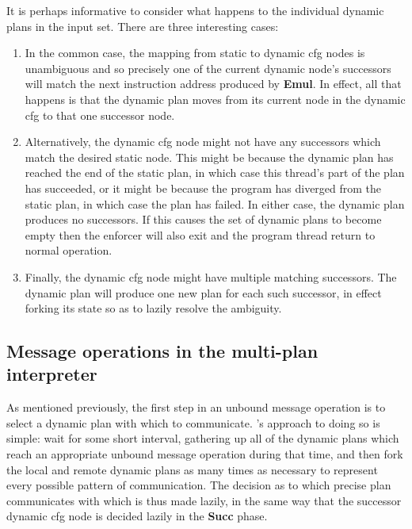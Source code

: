 It is perhaps informative to consider what happens to the individual
dynamic plans in the input set.  There are three interesting cases:
\begin{enumerate}
\item In the common case, the mapping from static to \gls{dynamic cfg}
  nodes is unambiguous and so precisely one of the current dynamic
  node's successors will match the next instruction address produced
  by \textbf{Emul}.  In effect, all that happens is that the dynamic
  plan moves from its current node in the \gls{dynamic cfg} to that
  one successor node.

\item Alternatively, the \gls{dynamic cfg} node might not have any
  successors which match the desired static node.  This might be
  because the dynamic plan has reached the end of the static plan, in
  which case this thread's part of the plan has succeeded, or it might
  be because the program has diverged from the static plan, in which
  case the plan has failed.  In either case, the dynamic plan produces
  no successors.  If this causes the set of dynamic plans to become
  empty then the enforcer will also exit and the program thread return
  to normal operation.

\item Finally, the \gls{dynamic cfg} node might have multiple matching
  successors.  The dynamic plan will produce one new plan for each
  such successor, in effect forking its state so as to lazily resolve
  the ambiguity.
\end{enumerate}

\subsection{Message operations in the multi-plan interpreter}
\label{sect:enforce:hli_messages}

As mentioned previously, the first step in an unbound message
operation is to select a dynamic plan with which to communicate.
{\Technique}'s approach to doing so is simple: wait for some short
interval, gathering up all of the dynamic plans which reach an
appropriate unbound message operation during that time, and then fork
the local and remote dynamic plans as many times as necessary to
represent every possible pattern of communication.  The decision as to
which precise plan communicates with which is thus made lazily, in the
same way that the successor \gls{dynamic cfg} node is decided lazily
in the \textbf{Succ} phase.

